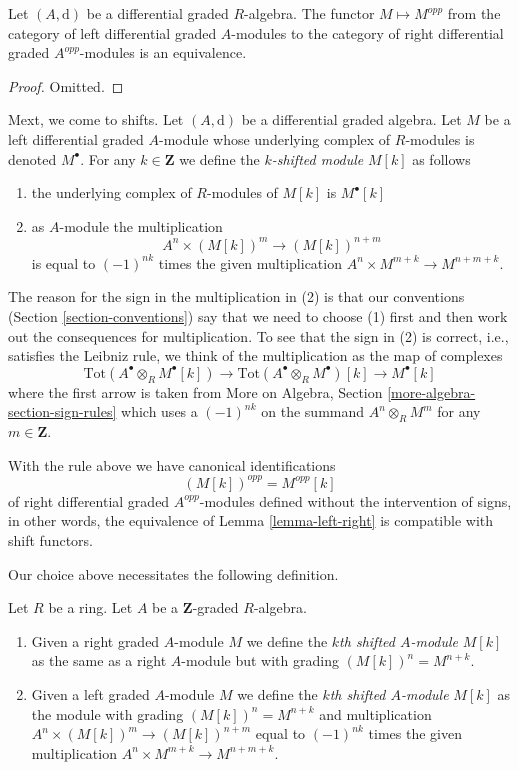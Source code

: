 \begin{lemma}
\label{lemma-left-right}
Let $(A, \text{d})$ be a differential graded $R$-algebra.
The functor $M \mapsto M^{opp}$ from the category of
left differential graded $A$-modules to the category of right
differential graded $A^{opp}$-modules is an equivalence.
\end{lemma}

\begin{proof}
Omitted.
\end{proof}

\noindent
Mext, we come to shifts. Let $(A, \text{d})$ be a differential graded algebra.
Let $M$ be a left differential graded $A$-module whose underlying complex
of $R$-modules is denoted $M^\bullet$.
For any $k \in \mathbf{Z}$ we define the {\it $k$-shifted module}
$M[k]$ as follows
\begin{enumerate}
\item the underlying complex of $R$-modules of $M[k]$ is $M^\bullet[k]$
\item as $A$-module the multiplication
$$
A^n \times (M[k])^m \longrightarrow (M[k])^{n + m}
$$
is equal to $(-1)^{nk}$ times the given multiplication
$A^n \times M^{m + k} \to M^{n + m + k}$.
\end{enumerate}
The reason for the sign in the multiplication in (2) is that our conventions
(Section \ref{section-conventions}) say that we need to choose (1) first
and then work out the consequences for multiplication. To see that the
sign in (2) is correct, i.e., satisfies the Leibniz rule, we think
of the multiplication as the map of complexes
$$
\text{Tot}(A^\bullet \otimes_R M^\bullet[k])
\to
\text{Tot}(A^\bullet \otimes_R M^\bullet)[k]
\to
M^\bullet[k]
$$
where the first arrow is taken from
More on Algebra, Section \ref{more-algebra-section-sign-rules}
which uses a $(-1)^{nk}$ on the summand $A^n \otimes_R M^m$
for any $m \in \mathbf{Z}$.

\medskip\noindent
With the rule above we have canonical identifications
$$
(M[k])^{opp} = M^{opp}[k]
$$
of right differential graded $A^{opp}$-modules
defined without the intervention of signs, in other words, the equivalence
of Lemma \ref{lemma-left-right} is compatible with shift functors.

\medskip\noindent
Our choice above necessitates the following definition.

\begin{definition}
\label{definition-shift-graded-module}
Let $R$ be a ring. Let $A$ be a $\mathbf{Z}$-graded $R$-algebra.
\begin{enumerate}
\item Given a right graded $A$-module $M$ we define the
{\it $k$th shifted $A$-module} $M[k]$ as the same as
a right $A$-module but with grading $(M[k])^n = M^{n + k}$.
\item Given a left graded $A$-module $M$ we define the
{\it $k$th shifted $A$-module} $M[k]$ as the module
with grading $(M[k])^n = M^{n + k}$ and multiplication
$A^n \times (M[k])^m \to (M[k])^{n + m}$
equal to $(-1)^{nk}$ times the given multiplication
$A^n \times M^{m + k} \to M^{n + m + k}$.
\end{enumerate}
\end{definition}


